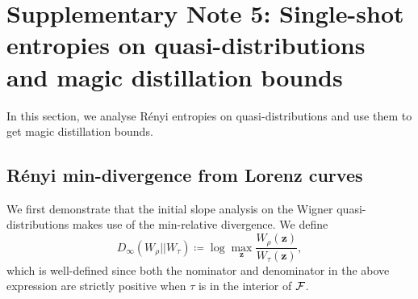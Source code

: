 \documentclass[
twocolumn,
superscriptaddress
]{revtex4-1}
\def\z{\boldsymbol{z}}
\def\F{{\cal F}}
\begin{document}
\section*{Supplementary Note 5: Single-shot entropies on quasi-distributions and magic distillation bounds}

In this section, we analyse R\'{e}nyi entropies on quasi-distributions and use them to get magic distillation bounds.

\subsection*{R\'{e}nyi min-divergence from Lorenz curves}
We first demonstrate that the initial slope analysis on the Wigner quasi-distributions makes use of the min-relative divergence. We define 
\begin{equation}
	D_\infty(W_\rho || W_\tau) \coloneqq \log  \max_{\z} \frac{W_\rho(\z)}{W_\tau(\z)},
\end{equation}
which is well-defined since both the nominator and denominator in the above expression are strictly positive when $\tau$ is in the interior of $\F$.
\end{document}

